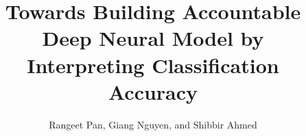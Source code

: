 \documentclass{llncs}
\begin{document}
\title{Towards Building Accountable Deep Neural Model by Interpreting Classification Accuracy}
\author{Rangeet Pan, Giang Nguyen, and Shibbir Ahmed}

%



\maketitle

\begin{abstract}

\end{abstract}

 






 

%
%



  
\end{document}
